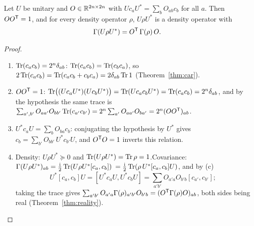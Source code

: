 \begin{theorem}\label{thm:congruence}
Let $U$ be unitary and $O\in\mathbb R^{2n\times2n}$ with $Uc_aU^*=\sum_bO_{ab}c_b$ for all $a$.
Then $OO^{\mathsf T}=1$, and for every density operator $\rho$, $U\rho U^*$ is a density operator with
\[
 \Gamma(U\rho U^*)=O^{\mathsf T}\,\Gamma(\rho)\,O .
\]
\end{theorem}
\begin{proof}
\begin{enumerate}
\item[(a)] $\operatorname{Tr}(c_ac_b)=2^n\delta_{ab}$: $\operatorname{Tr}(c_ac_b)=\operatorname{Tr}(c_bc_a)$, so
$2\operatorname{Tr}(c_ac_b)=\operatorname{Tr}(c_ac_b+c_bc_a)=2\delta_{ab}\operatorname{Tr} 1$ (Theorem~\ref{thm:car}).
\item[(b)] $OO^{\mathsf T}=1$: $\operatorname{Tr}\bigl((Uc_aU^*)(Uc_bU^*)\bigr)=\operatorname{Tr}(Uc_ac_bU^*)=\operatorname{Tr}(c_ac_b)=2^n\delta_{ab}$,
and by the hypothesis the same trace is
$\sum_{a',b'}O_{aa'}O_{bb'}\operatorname{Tr}(c_{a'}c_{b'})=2^n\sum_{a'}O_{aa'}O_{ba'}=2^n(OO^{\mathsf T})_{ab}$.
\item[(c)] $U^*c_aU=\sum_bO_{ba}c_b$: conjugating the hypothesis by $U^*$ gives
$c_b=\sum_{b'}O_{bb'}\,U^*c_{b'}U$, and $O^{\mathsf T}O=1$ inverts this relation.
\item[(d)] Density: $U\rho U^*\succeq0$ and $\operatorname{Tr}(U\rho U^*)=\operatorname{Tr}\rho=1$.\linebreak Covariance:
$\Gamma(U\rho U^*)_{ab}=\tfrac{\mathrm i}2\operatorname{Tr}(U\rho U^*[c_a,c_b])$
$=\tfrac{\mathrm i}2\operatorname{Tr}(\rho\,U^*[c_a,c_b]U)$,
and by (c)
\[
 U^*[c_a,c_b]U=[U^*c_aU,U^*c_bU]=\sum_{a'b'}O_{a'a}O_{b'b}[c_{a'},c_{b'}];
\]
taking the trace gives $\sum_{a'b'}O_{a'a}\Gamma(\rho)_{a'b'}O_{b'b}=(O^{\mathsf T}\Gamma(\rho)O)_{ab}$,
both sides being real (Theorem~\ref{thm:reality}). \qedhere
\end{enumerate}
\end{proof}

